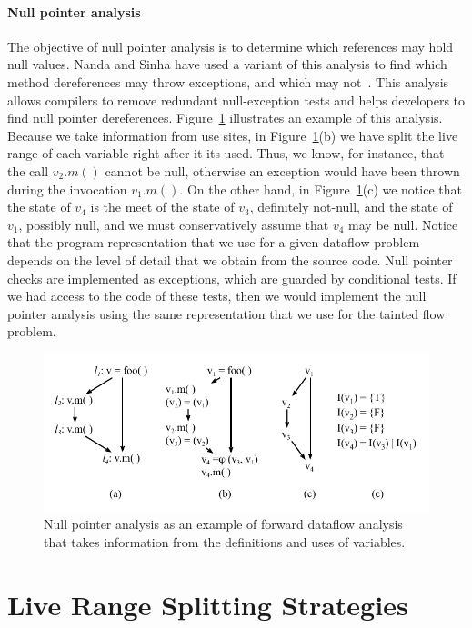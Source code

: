 \paragraph{Null pointer analysis}
The objective of null pointer analysis is to determine which references may
hold null values.
Nanda and Sinha have used a variant of this analysis to find which method
dereferences may throw exceptions, and which may not~\cite{Nanda09}.
This analysis allows compilers to remove redundant null-exception tests and
helps developers to find null pointer dereferences.
Figure~\ref{fig:nullAnalysis} illustrates an example of this analysis.
Because we take information from use sites, in Figure~\ref{fig:nullAnalysis}(b)
we have split the live range of each variable right after it its used.
Thus, we know, for instance, that the call $v_2.m()$ cannot be null, otherwise
an exception would have been thrown during the invocation $v_1.m()$.
On the other hand, in Figure~\ref{fig:nullAnalysis}(c) we notice that the state
of $v_4$ is the meet of the state of $v_3$, definitely not-null, and the state
of $v_1$, possibly null, and we must conservatively assume that $v_4$ may be
null.
Notice that the program representation that we use for a given dataflow problem
depends on the level of detail that we obtain from the source code.
Null pointer checks are implemented as exceptions, which are guarded by
conditional tests.
If we had access to the code of these tests, then we would implement the
null pointer analysis using the same representation that we use for the tainted
flow problem.

\begin{figure}[t!]
\centering
\includegraphics[width=\linewidth]{nullAnalysis}
\caption{Null pointer analysis as an example of forward dataflow analysis that takes information from
the definitions and uses of variables.}
\label{fig:nullAnalysis}
\end{figure}


\section{Live Range Splitting Strategies}
\label{sec:ssi:building}

